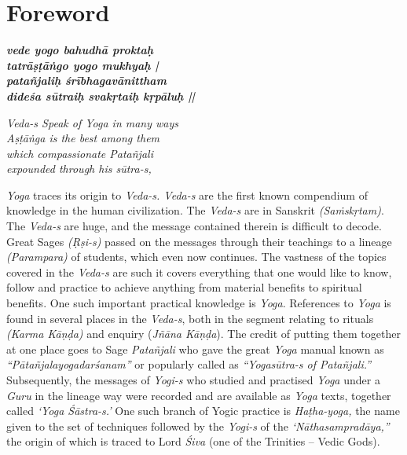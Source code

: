 \thispagestyle{empty}

\chapter*{Foreword}

\begin{shloka}
\centering
\noindent
 \emph{\textbf{vede yogo bahudhā proktaḥ}}\\
 \emph{\textbf{tatrāṣṭāṅgo yogo mukhyaḥ |}}\\
 \emph{\textbf{patañjaliḥ śrībhagavānittham}}\\
 \emph{\textbf{dideśa sūtraiḥ svakṛtaiḥ kṛpāluḥ ||}}
\smallskip

\textit{Veda-s Speak of Yoga in many ways}\\
\textit{Aṣṭāṅga is the best among them}\\
\textit{which compassionate Patañjali}\\
\textit{expounded through his sūtra-s,}
\end{shloka}

\noindent \textit{Yoga} traces its origin to \textit{Veda-s. Veda-s} are the first known compendium of knowledge in the human civilization.  The \textit{Veda-s} are in Sanskrit \textit{(Saṁskṛtam)}. The \textit{Veda-s} are huge, and the message contained therein is difficult to decode. Great Sages \textit{(Ṛṣi-s)} passed on the messages through their teachings to a lineage \textit{(Parampara)} of students, which even now continues. The vastness of the topics covered in the \textit{Veda-s} are such it covers everything that one would like to know, follow and practice to achieve anything from material benefits to spiritual benefits. One such important practical knowledge is \textit{Yoga}.  References to \textit{Yoga} is found in several places in the \textit{Veda-s}, both in the segment relating to rituals \textit{(Karma Kāṇḍa)} and enquiry (\textit{Jñāna Kāṇḍa}). The credit of putting them together at one place goes to Sage \textit{Patañjali} who gave the great \textit{Yoga} manual known as \textit{“Pātañjalayogadarśanam”} or popularly called as \textit{“Yogasūtra-s of Patañjali.”} Subsequently, the messages of \textit{Yogi-s} who studied and practised \textit{Yoga} under a \textit{Guru} in the lineage way were recorded and are available as \textit{Yoga} texts, together called \textit{‘Yoga Śāstra-s.’}  One such branch of Yogic practice is \textit{Haṭha-yoga,} the name given to the set of techniques followed by the \textit{Yogi-s} of the \textit{‘Nāthasampradāya,”} the origin of which is traced to Lord \textit{Śiva} (one of the Trinities – Vedic Gods).

